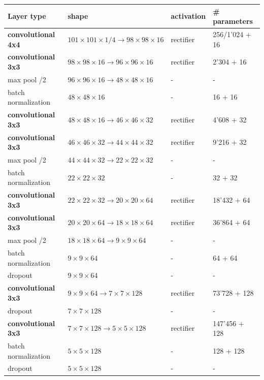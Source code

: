 \documentclass[useAMS,usenatbib]{mnras}
\begin{document}
\begin{table}
    \centering
    \begin{tabular}{|l|l|l|l|}
        \hline
        Layer type & shape & activation & \# parameters \\ \hline \hline
        
        \textbf{convolutional 4x4} & $101\!\times\! 101\!\times\!1/4 \to 98\!\times\!98\!\times\!16$ & rectifier & 256/1'024 + 16 \\ \hline
        \textbf{convolutional 3x3} & $98\times98\times16 \to 96\times96\times16$ & rectifier & 2'304 + 16 \\ \hline
        max pool /2 & $96\times96\times16 \to 48\times48\times16$ & - & - \\ \hline
        batch normalization & $48\times48\times16$ & - & 16 + 16 \\ \hline
        
        \textbf{convolutional 3x3} & $48\times48\times16 \to 46\times46\times32$ & rectifier & 4'608 + 32 \\ \hline
        \textbf{convolutional 3x3} & $46\times46\times32 \to 44\times44\times32$ & rectifier & 9'216 + 32 \\ \hline
        max pool /2 & $44\times44\times32 \to 22\times22\times32$ & - & - \\ \hline
        batch normalization & $22\times22\times32$ & - & 32 + 32 \\ \hline
        
        \textbf{convolutional 3x3} & $22\times22\times32 \to 20\times20\times64$ & rectifier & 18'432 + 64 \\ \hline
        \textbf{convolutional 3x3} & $20\times20\times64 \to 18\times18\times64$ & rectifier & 36'864 + 64 \\ \hline
        max pool /2 & $18\times18\times64 \to 9\times9\times64$ & - & - \\ \hline
        batch normalization & $9\times9\times64$ & - & 64 + 64 \\ \hline
        dropout & $9\times9\times64$ & - & - \\ \hline
        
        \textbf{convolutional 3x3} & $9\times9\times64 \to 7\times7\times128$ & rectifier & 73'728 + 128 \\ \hline
        dropout & $7\times7\times128$ & - & - \\ \hline
        \textbf{convolutional 3x3} & $7\times7\times128 \to 5\times5\times128$ & rectifier & 147'456 + 128 \\ \hline
        batch normalization & $5\times5\times128$ & - & 128 + 128 \\ \hline
        dropout & $5\times5\times128$ & - & - \\ \hline
        

\end{tabular}
\end{table}
\end{document}
